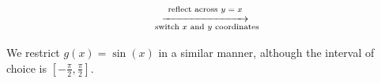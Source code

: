 \documentclass[12pt]{ximera}
\begin{document}
\[ \begin{array}{ccc}


&

\stackrel{\stackrel{\mbox{\scriptsize reflect across $y=x$}}{\xrightarrow{\hspace{1in}}}}{\mbox{ \scriptsize switch $x$ and $y$ coordinates}} 

&



\end{array}\]

\pagebreak 

We restrict $g(x) = \sin(x)$ in a similar manner, although the interval of choice is $\left[ -\frac{\pi}{2}, \frac{\pi}{2}\right]$.

\begin{center}



\end{center} 
\end{document}
